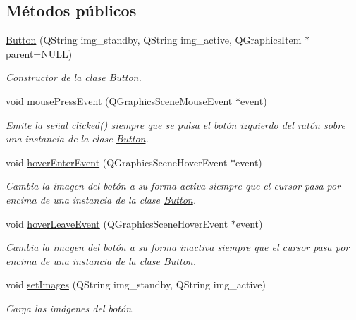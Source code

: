 \subsection*{Métodos públicos}
\begin{DoxyCompactItemize}
\item 
\hyperlink{classButton_aaa64acc02b613f8e480edb5040eb99d2}{Button} (Q\-String img\-\_\-standby, Q\-String img\-\_\-active, Q\-Graphics\-Item $\ast$parent=N\-U\-L\-L)
\begin{DoxyCompactList}\small\item\em Constructor de la clase \hyperlink{classButton}{Button}. \end{DoxyCompactList}\item 
void \hyperlink{classButton_a17d8eb0c904605b223bbc00c75655315}{mouse\-Press\-Event} (Q\-Graphics\-Scene\-Mouse\-Event $\ast$event)
\begin{DoxyCompactList}\small\item\em Emite la señal clicked() siempre que se pulsa el botón izquierdo del ratón sobre una instancia de la clase \hyperlink{classButton}{Button}. \end{DoxyCompactList}\item 
void \hyperlink{classButton_a633a9684818bc5d300a622a00064f09c}{hover\-Enter\-Event} (Q\-Graphics\-Scene\-Hover\-Event $\ast$event)
\begin{DoxyCompactList}\small\item\em Cambia la imagen del botón a su forma activa siempre que el cursor pasa por encima de una instancia de la clase \hyperlink{classButton}{Button}. \end{DoxyCompactList}\item 
void \hyperlink{classButton_a1689a97690d9469ce8350d24db0d7485}{hover\-Leave\-Event} (Q\-Graphics\-Scene\-Hover\-Event $\ast$event)
\begin{DoxyCompactList}\small\item\em Cambia la imagen del botón a su forma inactiva siempre que el cursor pasa por encima de una instancia de la clase \hyperlink{classButton}{Button}. \end{DoxyCompactList}\item 
void \hyperlink{classButton_a4706976fe64d05194702baa179fa99da}{set\-Images} (Q\-String img\-\_\-standby, Q\-String img\-\_\-active)
\begin{DoxyCompactList}\small\item\em Carga las imágenes del botón. \end{DoxyCompactList}\end{DoxyCompactItemize}


